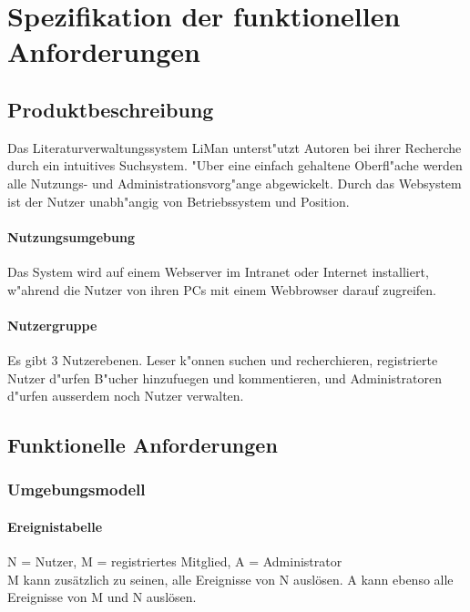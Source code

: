 \chapter{Spezifikation der funktionellen Anforderungen}
\section{Produktbeschreibung}
Das Literaturverwaltungssystem LiMan unterst"utzt Autoren bei
ihrer Recherche durch ein intuitives Suchsystem. "Uber eine einfach
gehaltene Oberfl"ache werden alle Nutzungs- und Administrationsvorg"ange
abgewickelt. Durch das Websystem ist der Nutzer unabh"angig von Betriebssystem 
und Position.
\subsubsection{Nutzungsumgebung}
Das System wird auf einem Webserver im Intranet oder 
Internet installiert, w"ahrend die Nutzer von ihren PCs mit
einem Webbrowser darauf zugreifen.
\subsubsection{Nutzergruppe}
Es gibt 3 Nutzerebenen. Leser k"onnen suchen und recherchieren,
registrierte Nutzer d"urfen B"ucher hinzufuegen und kommentieren, und Administratoren
d"urfen ausserdem noch Nutzer verwalten.


\section{Funktionelle Anforderungen}
\subsection{Umgebungsmodell}

\subsubsection{Ereignistabelle}
N = Nutzer, M = registriertes Mitglied, A = Administrator \\
M kann zusätzlich zu seinen, alle Ereignisse von N auslösen. A kann ebenso alle Ereignisse von M und N auslösen.

